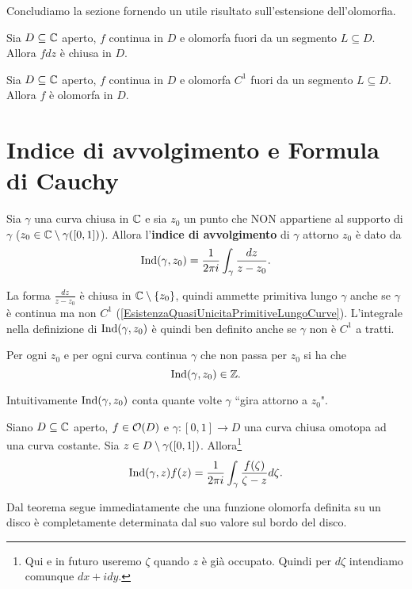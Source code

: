 \begin{multicols*}{2}
\noindent
Concludiamo la sezione fornendo un utile risultato sull'estensione dell'olomorfia.


\begin{theorem}\label{ContinuaOlomorfaEccettoInSegmentoDaFormaChiusa}
Sia $D\subseteq \mathbb{C}$ aperto, $f$ continua in $D$ e olomorfa fuori da un segmento $L\subseteq D$. Allora $fdz$ \`e chiusa in $D$.
\end{theorem}
\begin{corollary}\label{ContinuaOlomorfaEccettoUnPuntoEOlomorfa}
Sia $D\subseteq \mathbb{C}$ aperto, $f$ continua in $D$ e olomorfa $C^1$ fuori da un segmento $L\subseteq D$. Allora $f$ \`e olomorfa in $D$.
\end{corollary}

\section{Indice di avvolgimento e Formula di Cauchy}
\begin{definition}
Sia $\gamma$ una curva chiusa in $\mathbb{C}$ e sia $z_0$ un punto che NON appartiene al supporto di $\gamma$ ($z_0\in \mathbb{C}\setminus \gamma([0,1])$). Allora l'\textbf{indice di avvolgimento} di $\gamma$ attorno $z_0$ \`e dato da
\[\mathrm{Ind}(\gamma,z_0)=\frac1{2\pi i}\int_{\gamma}\frac{dz}{z-z_0}.\]
\end{definition}
\begin{remark}
La forma $\frac{dz}{z-z_0}$ \`e chiusa in $\mathbb{C}\setminus\{z_0\}$, quindi ammette primitiva lungo $\gamma$ anche se $\gamma$ \`e continua ma non $C^1$ (\ref{EsistenzaQuasiUnicitaPrimitiveLungoCurve}). L'integrale nella definizione di $\mathrm{Ind}(\gamma,z_0)$ \`e quindi ben definito anche se $\gamma$ non \`e $C^1$ a tratti.
\end{remark}

\begin{proposition}\label{IndiceAvvolgimentoEIntero}
Per ogni $z_0$ e per ogni curva continua $\gamma$ che non passa per $z_0$ si ha che
\[\mathrm{Ind}(\gamma,z_0)\in \mathbb{Z}.\]
\end{proposition}
\begin{remark}
Intuitivamente $\mathrm{Ind}(\gamma,z_0)$ conta quante volte $\gamma$ ``gira attorno a $z_0$".
\end{remark}





\begin{theorem}\label{FormulaIntegraleCauchy}
Siano $D\subseteq\mathbb{C}$ aperto, $f\in\mathcal{O}(D)$ e $\gamma:[0,1]\to D$ una curva chiusa omotopa ad una curva costante. Sia $z\in D\setminus\gamma([0,1])$. Allora\footnote{Qui e in futuro useremo $\zeta$ quando $z$ \`e gi\`a occupato. Quindi per $d\zeta$ intendiamo comunque $dx+idy$.}
\[\mathrm{Ind}(\gamma,z)f(z)=\frac1{2\pi i}\int_\gamma \frac{f(\zeta)}{\zeta-z}d\zeta.\]
\end{theorem}
\begin{remark}
Dal teorema segue immediatamente che una funzione olomorfa definita su un disco \`e completamente determinata dal suo valore sul bordo del disco.
\end{remark}


\end{multicols*}
